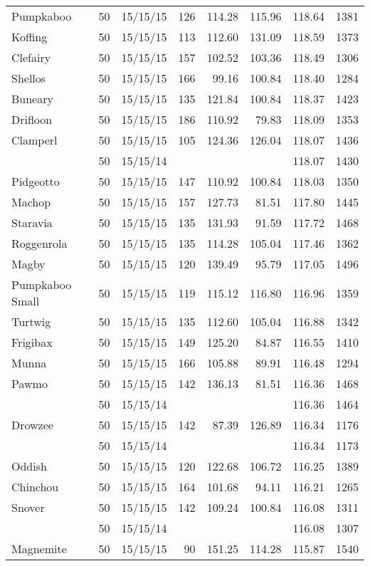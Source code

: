 \begin{longtable}{lrrrrrrr}
Pumpkaboo & 50 & 15/15/15 & 126 & 114.28 & 115.96 & 118.64 & 1381\\
Koffing & 50 & 15/15/15 & 113 & 112.60 & 131.09 & 118.59 & 1373\\
Clefairy & 50 & 15/15/15 & 157 & 102.52 & 103.36 & 118.49 & 1306\\
Shellos & 50 & 15/15/15 & 166 & 99.16 & 100.84 & 118.40 & 1284\\
Buneary & 50 & 15/15/15 & 135 & 121.84 & 100.84 & 118.37 & 1423\\
Drifloon & 50 & 15/15/15 & 186 & 110.92 & 79.83 & 118.09 & 1353\\
Clamperl & 50 & 15/15/15 & 105 & 124.36 & 126.04 & 118.07 & 1436\\
 & 50 & 15/15/14 & & & & 118.07 & 1430\\
Pidgeotto & 50 & 15/15/15 & 147 & 110.92 & 100.84 & 118.03 & 1350\\
Machop & 50 & 15/15/15 & 157 & 127.73 & 81.51 & 117.80 & 1445\\
Staravia & 50 & 15/15/15 & 135 & 131.93 & 91.59 & 117.72 & 1468\\
Roggenrola & 50 & 15/15/15 & 135 & 114.28 & 105.04 & 117.46 & 1362\\
Magby & 50 & 15/15/15 & 120 & 139.49 & 95.79 & 117.05 & 1496\\
Pumpkaboo Small & 50 & 15/15/15 & 119 & 115.12 & 116.80 & 116.96 & 1359\\
Turtwig & 50 & 15/15/15 & 135 & 112.60 & 105.04 & 116.88 & 1342\\
Frigibax & 50 & 15/15/15 & 149 & 125.20 & 84.87 & 116.55 & 1410\\
Munna & 50 & 15/15/15 & 166 & 105.88 & 89.91 & 116.48 & 1294\\
Pawmo & 50 & 15/15/15 & 142 & 136.13 & 81.51 & 116.36 & 1468\\
 & 50 & 15/15/14 & & & & 116.36 & 1464\\
Drowzee & 50 & 15/15/15 & 142 & 87.39 & 126.89 & 116.34 & 1176\\
 & 50 & 15/15/14 & & & & 116.34 & 1173\\
Oddish & 50 & 15/15/15 & 120 & 122.68 & 106.72 & 116.25 & 1389\\
Chinchou & 50 & 15/15/15 & 164 & 101.68 & 94.11 & 116.21 & 1265\\
Snover & 50 & 15/15/15 & 142 & 109.24 & 100.84 & 116.08 & 1311\\
 & 50 & 15/15/14 & & & & 116.08 & 1307\\
Magnemite & 50 & 15/15/15 & 90 & 151.25 & 114.28 & 115.87 & 1540\\

\end{longtable}
